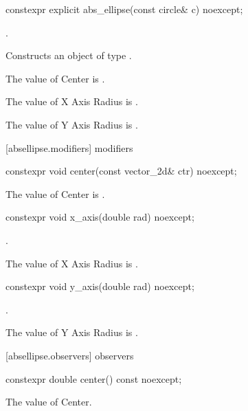\begin{itemdecl}
constexpr explicit abs_ellipse(const circle& c) noexcept;
\end{itemdecl}
\begin{itemdescr}
\pnum
\requires
{}.

\pnum
\effects
Constructs an object of type .

\pnum
The value of Center is .

\pnum
The value of X Axis Radius is .

\pnum
The value of Y Axis Radius is .
\end{itemdescr}

 [absellipse.modifiers]{ modifiers}

\begin{itemdecl}
constexpr void center(const vector_2d& ctr) noexcept;
\end{itemdecl}

\begin{itemdescr}
\pnum
\effects
The value of Center is .
\end{itemdescr}

\begin{itemdecl}
constexpr void x_axis(double rad) noexcept;
\end{itemdecl}
\begin{itemdescr}
\requires
{}.

\pnum
\effects
The value of X Axis Radius is .
\end{itemdescr}

\begin{itemdecl}
constexpr void y_axis(double rad) noexcept;
\end{itemdecl}
\begin{itemdescr}
\requires
{}.

\pnum
\effects
The value of Y Axis Radius is .
\end{itemdescr}

 [absellipse.observers]{ observers}

\begin{itemdecl}
constexpr double center() const noexcept;
\end{itemdecl}
\begin{itemdescr}
\pnum
\returns
The value of Center.
\end{itemdescr}

